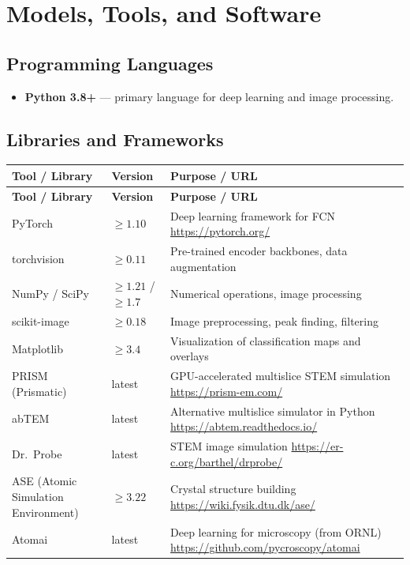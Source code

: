 \documentclass[11pt,a4paper]{article}
\begin{document}
\section{Models, Tools, and Software}

\subsection{Programming Languages}
\begin{itemize}
  \item \textbf{Python 3.8+} --- primary language for deep learning and image processing.
\end{itemize}

\subsection{Libraries and Frameworks}
\begin{longtable}{p{4.5cm} p{2.5cm} p{6.5cm}}
\toprule
\textbf{Tool / Library} & \textbf{Version} & \textbf{Purpose / URL} \\
\midrule
\endfirsthead
\toprule
\textbf{Tool / Library} & \textbf{Version} & \textbf{Purpose / URL} \\
\midrule
\endhead
PyTorch & $\geq 1.10$ & Deep learning framework for FCN \newline \url{https://pytorch.org/} \\
\midrule
torchvision & $\geq 0.11$ & Pre-trained encoder backbones, data augmentation \\
\midrule
NumPy / SciPy & $\geq 1.21$ / $\geq 1.7$ & Numerical operations, image processing \\
\midrule
scikit-image & $\geq 0.18$ & Image preprocessing, peak finding, filtering \\
\midrule
Matplotlib & $\geq 3.4$ & Visualization of classification maps and overlays \\
\midrule
PRISM (Prismatic) & latest & GPU-accelerated multislice STEM simulation \newline \url{https://prism-em.com/} \\
\midrule
abTEM & latest & Alternative multislice simulator in Python \newline \url{https://abtem.readthedocs.io/} \\
\midrule
Dr.\ Probe & latest & STEM image simulation \newline \url{https://er-c.org/barthel/drprobe/} \\
\midrule
ASE (Atomic Simulation Environment) & $\geq 3.22$ & Crystal structure building \newline \url{https://wiki.fysik.dtu.dk/ase/} \\
\midrule
Atomai & latest & Deep learning for microscopy (from ORNL) \newline \url{https://github.com/pycroscopy/atomai} \\
\bottomrule
\end{longtable}
\end{document}
